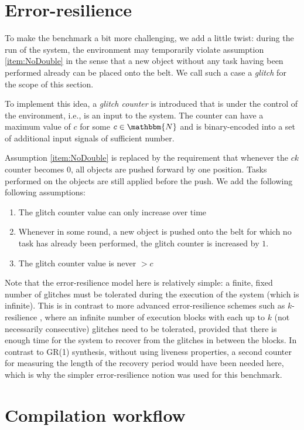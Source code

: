 \documentclass[a4paper,10pt]{IEEEtran}
\newcommand{\NN}{\mathbbm{N}}
\begin{document}
\section{Error-resilience}

\noindent To make the benchmark a bit more challenging, we add a little twist: during the run of the system, the environment may temporarily violate assumption \ref{item:NoDouble} in the sense that a new object without any task having been performed already can be placed onto the belt. We call such a case a \emph{glitch} for the scope of this section.

To implement this idea, a \emph{glitch counter} is introduced that is under the control of the environment, i.e., is an input to the system. The counter can have a maximum value of $c$ for some $c \in \NN$ and is binary-encoded into a set of additional input signals of sufficient number. 

Assumption \ref{item:NoDouble} is replaced by the requirement that whenever the $\mathit{ck}$ counter becomes $0$, all objects are pushed forward by one position. Tasks performed on the objects are still applied before the push.
We add the following following assumptions:
\begin{enumerate}
\item The glitch counter value can only increase over time
\item Whenever in some round, a new object is pushed onto the belt for which no task has already been performed, the glitch counter is increased by $1$.
\item The glitch counter value is never $> c$
\end{enumerate}

Note that the error-resilience model here is relatively simple: a finite, fixed number of glitches must be tolerated during the execution of the system (which is infinite). 
This is in contrast to more advanced error-resilience schemes such as $k$-resilience \cite{DBLP:journals/corr/abs-1210-2449,EhlersTopcuHSCC2014}, where an infinite number of execution blocks with each up to $k$ (not necessarily consecutive) glitches need to be tolerated, provided that there is enough time for the system to recover from the glitches in between the blocks. In contrast to GR(1) synthesis, without using liveness properties, a second counter for measuring the length of the recovery period would have been needed here, which is why the simpler error-resilience notion was used for this benchmark.

\section{Compilation workflow}
\end{document}
